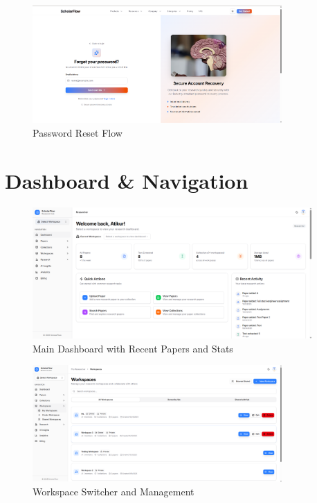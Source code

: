 \begin{figure}[H]
\centering
\includegraphics[width=0.85\textwidth]{images/screenshots/reset_password.png}
\caption{Password Reset Flow}
\label{fig:screenshot-reset}
\end{figure}

\section{Dashboard \& Navigation}
\label{sec:screenshots-dashboard}

\begin{figure}[H]
\centering
\includegraphics[width=0.95\textwidth]{images/screenshots/dashboard_overview.png}
\caption{Main Dashboard with Recent Papers and Stats}
\label{fig:screenshot-dashboard}
\end{figure}

\begin{figure}[H]
\centering
\includegraphics[width=0.85\textwidth]{images/screenshots/workspaces.png}
\caption{Workspace Switcher and Management}
\label{fig:screenshot-workspaces}
\end{figure}

